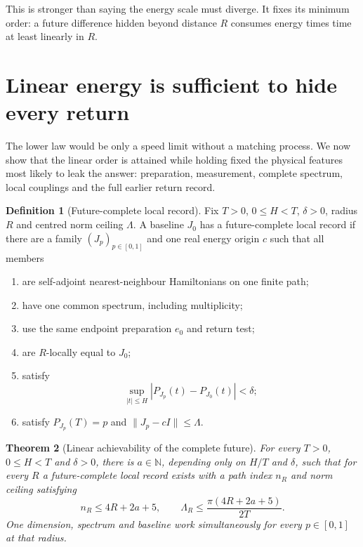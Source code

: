 \documentclass[10pt]{article}
\numberwithin{equation}{section}
\newtheorem{theorem}{Theorem}[section]
\theoremstyle{definition}
\newtheorem{definition}[theorem]{Definition}
\theoremstyle{remark}
\newcommand{\N}{\mathbb N}
\newcommand{\norm}[1]{\lVert #1\rVert}
\begin{document}
This is stronger than saying the energy scale must diverge.  It fixes its
minimum order: a future difference hidden beyond distance \(R\) consumes
energy times time at least linearly in \(R\).

\section{Linear energy is sufficient to hide every return}

The lower law would be only a speed limit without a matching process.  We
now show that the linear order is attained while holding fixed the physical
features most likely to leak the answer: preparation, measurement, complete
spectrum, local couplings and the full earlier return record.

\begin{definition}[Future-complete local record]
Fix \(T>0\), \(0\le H<T\), \(\delta>0\), radius \(R\) and centred norm
ceiling \(\Lambda\).  A baseline \(J_0\) has a future-complete local record
if there are a family \((J_p)_{p\in[0,1]}\) and one real energy origin \(c\)
such that all members
\begin{enumerate}
\item are self-adjoint nearest-neighbour Hamiltonians on one finite path;
\item have one common spectrum, including multiplicity;
\item use the same endpoint preparation \(e_0\) and return test;
\item are \(R\)-locally equal to \(J_0\);
\item satisfy
\[
 \sup_{|t|\le H}|P_{J_p}(t)-P_{J_0}(t)|<\delta;
\]
\item satisfy \(P_{J_p}(T)=p\) and
\(\norm{J_p-cI}\le\Lambda\).
\end{enumerate}
\end{definition}

\begin{theorem}[Linear achievability of the complete future]
\label{thm:achievability}
For every \(T>0\), \(0\le H<T\) and \(\delta>0\), there is
\(a\in\N\), depending only on \(H/T\) and \(\delta\), such that for every
\(R\) a future-complete local record exists with a path index \(n_R\) and
norm ceiling satisfying
\begin{equation}
 n_R\le4R+2a+5,\qquad
 \Lambda_R\le\frac{\pi(4R+2a+5)}{2T}.
\label{eq:upper}
\end{equation}
One dimension, spectrum and baseline work simultaneously for every
\(p\in[0,1]\) at that radius.
\end{theorem}
\end{document}
